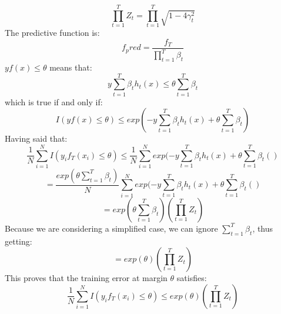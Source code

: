 \begin{equation*}
	\prod_{t=1}^{T} Z_t =\prod_{t=1}^{T} \sqrt{1-4\gamma_t^2}
\end{equation*}
The predictive function is:
\begin{equation*}
	f_pred = \frac{f_T}{\prod_{t=1}^{T} \beta_t}
\end{equation*}
$yf(x) \leq \theta$ means that:
\begin{equation*}
	y\sum_{t=1}^{T}\beta_th_t(x) \leq \theta\sum_{t=1}^{T}\beta_t
\end{equation*}
which is true if and only if:
\begin{equation*}
	I(yf(x) \leq \theta) \leq exp(-y \sum_{t=1}^{T} \beta_th_t(x) + \theta\sum_{t=1}^{T}\beta_t)
\end{equation*}
Having said that:
\begin{equation*}
	\frac{1}{N}\sum_{i=1}^{N}I(y_if_T(x_i) \leq \theta) \leq \frac{1}{N} \sum_{i=1}^{N} exp(-y \sum_{t=1}^{T} \beta_th_t(x) + \theta\sum_{t=1}^{T}\beta_t()
\end{equation*}
\begin{equation*}
	= \frac{exp(\theta\sum_{t=1}^{T}\beta_t)}{N} \sum_{i=1}^{N} exp(-y \sum_{t=1}^{T} \beta_th_t(x) + \theta\sum_{t=1}^{T}\beta_t()
\end{equation*}
\begin{equation*}
	= exp(\theta\sum_{t=1}^{T}\beta_t)(\prod_{t=1}^{T} Z_t)
\end{equation*}
Because we are considering a simplified case, we can ignore $\sum_{t=1}^{T}\beta_t$, thus getting:
\begin{equation*}
	= exp(\theta)(\prod_{t=1}^{T} Z_t)
\end{equation*}
This proves that the training error at margin $\theta$ satisfies:
\begin{equation*}
	\frac{1}{N}\sum_{i=1}^{N}I(y_if_T(x_i) \leq \theta) \leq exp(\theta)(\prod_{t=1}^{T} Z_t)
\end{equation*}